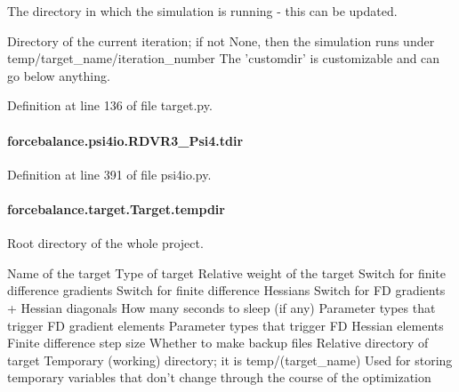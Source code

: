 The directory in which the simulation is running -\/ this can be updated. 

Directory of the current iteration; if not None, then the simulation runs under temp/target\-\_\-name/iteration\-\_\-number The 'customdir' is customizable and can go below anything.

Definition at line 136 of file target.\-py.

\hypertarget{classforcebalance_1_1psi4io_1_1RDVR3__Psi4_afba333b01de406679320bd268435fd94}{
\paragraph[{tdir}]{\setlength{\rightskip}{0pt plus 5cm}forcebalance.\-psi4io.\-R\-D\-V\-R3\-\_\-\-Psi4.\-tdir}}\label{classforcebalance_1_1psi4io_1_1RDVR3__Psi4_afba333b01de406679320bd268435fd94}


Definition at line 391 of file psi4io.\-py.

\hypertarget{classforcebalance_1_1target_1_1Target_aa1f01b5b78db253b5b66384ed11ed193}{
\paragraph[{tempdir}]{\setlength{\rightskip}{0pt plus 5cm}forcebalance.\-target.\-Target.\-tempdir\hspace{0.3cm}{\ttfamily [inherited]}}}\label{classforcebalance_1_1target_1_1Target_aa1f01b5b78db253b5b66384ed11ed193}


Root directory of the whole project. 

Name of the target Type of target Relative weight of the target Switch for finite difference gradients Switch for finite difference Hessians Switch for F\-D gradients + Hessian diagonals How many seconds to sleep (if any) Parameter types that trigger F\-D gradient elements Parameter types that trigger F\-D Hessian elements Finite difference step size Whether to make backup files Relative directory of target Temporary (working) directory; it is temp/(target\-\_\-name) Used for storing temporary variables that don't change through the course of the optimization 

